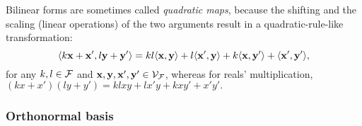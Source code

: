 \begin{remark}
Bilinear forms are sometimes called \textit{quadratic maps}, because the shifting and the scaling (linear operations) of the two arguments result in a quadratic-rule-like transformation:
%
$$ \langle k \mathbf{x}+ \mathbf{x}', l \mathbf{y} +\mathbf{y}' \rangle = kl \langle  \mathbf{x}, \mathbf{y} \rangle + l\langle  \mathbf{x}', \mathbf{y} \rangle + k\langle  \mathbf{x}, \mathbf{y}' \rangle + \langle  \mathbf{x}', \mathbf{y}' \rangle,$$
%
for any $k,l \in {\mathcal{F}}$ and $ \mathbf{x},\mathbf{y},\mathbf{x}',\mathbf{y}' \in \mathcal{V}_{\mathcal{F}}$, whereas for reals' multiplication,
$    (kx+x')(ly+y') = klxy + lx'y + kxy' + x'y'.$
\end{remark}


\subsubsection{Orthonormal basis}

